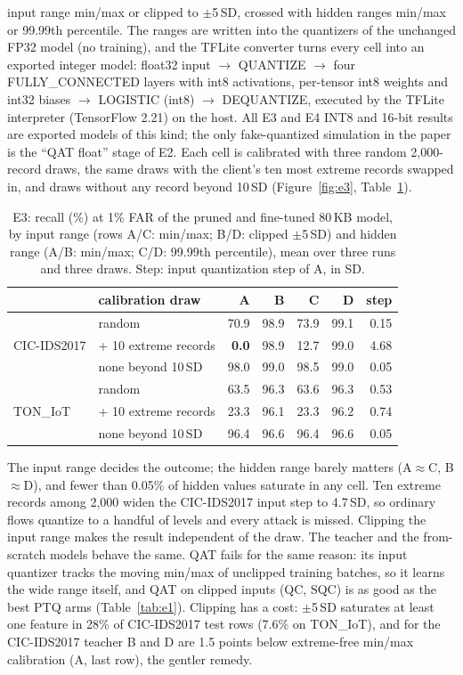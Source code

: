 \documentclass[sigplan,10pt,review,anonymous,nonacm]{acmart}
\newcommand{\cic}{CIC-IDS2017\xspace}
\newcommand{\ton}{TON\_IoT\xspace}
\begin{document}
input range min/max or clipped to $\pm$5\,SD, crossed with hidden ranges min/max or 99.99th percentile.
The ranges are written into the quantizers of the unchanged FP32 model (no training), and the TFLite
converter turns every cell into an exported integer model: float32 input $\rightarrow$ QUANTIZE
$\rightarrow$ four FULLY\_CONNECTED layers with int8 activations, per-tensor int8 weights and int32
biases $\rightarrow$ LOGISTIC (int8) $\rightarrow$ DEQUANTIZE, executed by the TFLite interpreter
(TensorFlow 2.21) on the host. All E3 and E4 INT8 and 16-bit results are exported models of this kind;
the only fake-quantized simulation in the paper is the ``QAT float'' stage of E2. Each cell is calibrated with three random 2,000-record
draws, the same draws with the client's ten most extreme records swapped in, and draws without any
record beyond 10\,SD (Figure~\ref{fig:e3}, Table~\ref{tab:e3}).

\begin{table}[t]
\caption{E3: recall (\%) at 1\% FAR of the pruned and fine-tuned 80\,KB model, by input range (rows A/C:
min/max; B/D: clipped $\pm$5\,SD) and hidden range (A/B: min/max; C/D: 99.99th percentile), mean over
three runs and three draws. Step: input quantization step of A, in SD.}
\label{tab:e3}
\small\setlength{\tabcolsep}{3pt}
\begin{tabular}{llrrrrr}
\toprule
 & calibration draw & A & B & C & D & step \\
\midrule
\multirow{3}{*}{\cic} & random & 70.9 & 98.9 & 73.9 & 99.1 & 0.15 \\
 & + 10 extreme records & \textbf{0.0} & 98.9 & 12.7 & 99.0 & 4.68 \\
 & none beyond 10\,SD & 98.0 & 99.0 & 98.5 & 99.0 & 0.05 \\
\midrule
\multirow{3}{*}{\ton} & random & 63.5 & 96.3 & 63.6 & 96.3 & 0.53 \\
 & + 10 extreme records & 23.3 & 96.1 & 23.3 & 96.2 & 0.74 \\
 & none beyond 10\,SD & 96.4 & 96.6 & 96.4 & 96.6 & 0.05 \\
\bottomrule
\end{tabular}
\end{table}

The input range decides the outcome; the hidden range barely matters (A$\approx$C, B$\approx$D), and
fewer than 0.05\% of hidden values saturate in any cell. Ten extreme records among 2,000 widen the
\cic input step to 4.7\,SD, so ordinary flows quantize to a handful of levels and every attack is
missed. Clipping the input range makes the result independent of the draw. The teacher and the
from-scratch models behave the same. QAT fails for the same reason: its input quantizer tracks the
moving min/max of unclipped training batches, so it learns the wide range itself, and QAT on clipped
inputs (QC, SQC) is as good as the best PTQ arms (Table~\ref{tab:e1}). Clipping has a cost: $\pm$5\,SD
saturates at least one feature in 28\% of \cic test rows (7.6\% on \ton), and for the \cic teacher
B and D are 1.5 points below extreme-free min/max calibration (A, last row), the gentler remedy.
\end{document}
